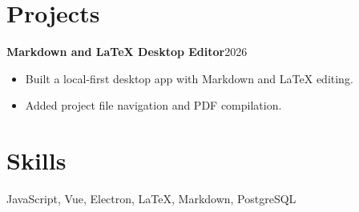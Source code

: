 \section*{Projects}
\textbf{Markdown and LaTeX Desktop Editor}\hfill 2026
\begin{itemize}[leftmargin=*]
  \item Built a local-first desktop app with Markdown and LaTeX editing.
  \item Added project file navigation and PDF compilation.
\end{itemize}
\section*{Skills}
JavaScript, Vue, Electron, LaTeX, Markdown, PostgreSQL
